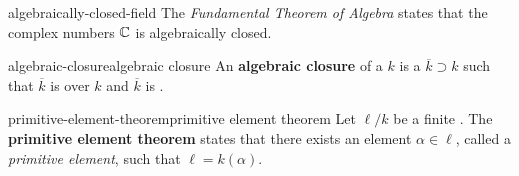 \begin{example}{algebraically-closed-field}
    The \textit{Fundamental Theorem of Algebra} states that the complex numbers $\mathbb{C}$ is algebraically closed.
\end{example}

\begin{topic}{algebraic-closure}{algebraic closure}
    An \textbf{algebraic closure} of a  $k$ is a  $\overline{k} \supset k$ such that $\overline{k}$ is  over $k$ and $\overline{k}$ is .
\end{topic}

\begin{topic}{primitive-element-theorem}{primitive element theorem}
    Let $\ell/k$ be a finite . The \textbf{primitive element theorem} states that there exists an element $\alpha \in \ell$, called a \textit{primitive element}, such that $\ell = k(\alpha)$.
\end{topic}

